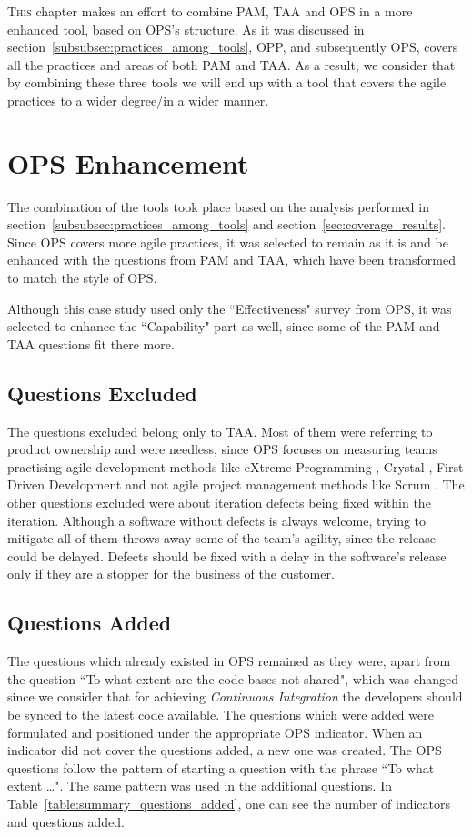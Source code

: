 \lettrine[lines=2, loversize=-0.1, lraise=0.1]{T}{his} chapter makes an effort to combine \ac{PAM}, \ac{TAA} and \ac{OPS} in a more enhanced tool, based on \ac{OPS}'s structure. As it was discussed in section~\ref{subsubsec:practices_among_tools}, \ac{OPP}, and subsequently \ac{OPS}, covers all the practices and areas of both \ac{PAM} and \ac{TAA}. As a result, we consider that by combining these three tools we will end up with a tool that covers the agile practices to a wider degree/in a wider manner.

\section{\ac{OPS} Enhancement}
The combination of the tools took place based on the analysis performed in section~\ref{subsubsec:practices_among_tools} and section~\ref{sec:coverage_results}. Since \ac{OPS} covers more agile practices, it was selected to remain as it is and be enhanced with the questions from \ac{PAM} and \ac{TAA}, which have been transformed to match the style of \ac{OPS}.

Although this case study used only the ``Effectiveness" survey from \ac{OPS}, it was selected to enhance the ``Capability" part as well, since some of the \ac{PAM} and \ac{TAA} questions fit there more.

\subsection{Questions Excluded}
The questions excluded belong only to \ac{TAA}. Most of them were referring to product ownership and were needless, since \ac{OPS} focuses on measuring teams practising agile development methods like eXtreme Programming \cite{Beck:2004:EPE:1076267}, Crystal \cite{Cockburn:2004:CCH:1406822}, First Driven Development \cite{Palmer:2001:PGF:600044} and not agile project management methods like Scrum \cite{scrum}. The other questions excluded were about iteration defects being fixed within the iteration. Although a software without defects is always welcome, trying to mitigate all of them throws away some of the team's agility, since the release could be delayed. Defects should be fixed with a delay in the software's release only if they are a stopper for the business of the customer.

\subsection{Questions Added}
The questions which already existed in \ac{OPS} remained as they were, apart from the question ``To what extent are the code bases not shared", which was changed since we consider that for achieving \textit{Continuous Integration} the developers should be synced to the latest code available. The questions which were added were formulated and positioned under the appropriate \ac{OPS} indicator. When an indicator did not cover the questions added, a new one was created. The \ac{OPS} questions follow the pattern of starting a question with the phrase ``To what extent \dots ". The same pattern was used in the additional questions. In Table~\ref{table:summary_questions_added}, one can see the number of indicators and questions added. 

